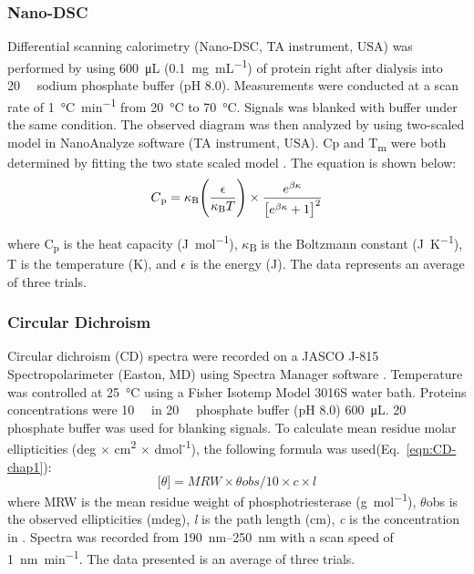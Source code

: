 \begin{refsection}
\subsubsection{Nano-DSC}
\label{sec:dsc-method}

Differential scanning calorimetry (Nano-DSC, TA instrument, USA) was performed
by using \SI{600}{\micro\L} (\SI{0.1}{\mg\per\mL}) of protein right after
dialysis into \SI{20}{\milli\Molar} sodium phosphate buffer (pH 8.0).
Measurements were conducted at a scan rate of \SI{1}{\celsius\per\minute} from
\SI{20}{\celsius} to \SI{70}{\celsius}.  Signals was blanked with buffer under
the same condition.  The observed diagram was then analyzed by using
two-scaled model in NanoAnalyze software (TA instrument, USA). Cp and
T\textsubscript{m} were both determined by fitting the two state scaled model
\cite{Privalov1986}. The equation is shown below:
\begin{equation}
    C\textsubscript{p} = \kappa\textsubscript{B}
    \Bigg(\frac{\epsilon}{\kappa\textsubscript{B}T}\Bigg) \times
    \frac{e^{\beta\kappa}}{\big[e^{\beta\kappa}+1\big]^{2}} \label{eqn:dsc}
\end{equation}

where C\textsubscript{p} is the heat capacity (\si{\J\per\mol}),
$\kappa$\textsubscript{B} is the Boltzmann constant (\si{\J\per\kelvin}), T is
the temperature (\si{\kelvin}), and $\epsilon$ is the energy (\si{J}). The data
represents an average of three trials. 


\subsubsection{Circular Dichroism}
\label{sec:cd-method}

Circular dichroism (CD) spectra were recorded on a JASCO J-815 Spectropolarimeter
(Easton, MD) using Spectra Manager software \cite{Kataev1985}. Temperature was
controlled at \SI{25}{\celsius} using a Fisher Isotemp Model 3016S water bath.
Proteins concentrations were \SI{10}{\micro\Molar} in \SI{20}{\milli\Molar}
phosphate buffer (pH 8.0) \SI{600}{\micro\liter}.  \SI{20}{\milli\Molar}
phosphate buffer was used for blanking signals. To calculate mean residue molar
ellipticities (deg $\times$ cm\textsuperscript{2} $\times$
dmol\textsuperscript{-1}), the following formula \cite{Kelly2005} was
used(Eq.~\ref{eqn:CD-chap1}): 
\begin{equation}
    \big[\theta\big] = MRW \times \theta obs / 10 \times c \times l
    \label{eqn:CD-chap1}
\end{equation}
where MRW is the mean residue weight of phosphotriesterase
(\si{\gram\per\mol}), $\theta$obs is the observed ellipticities (mdeg),
\emph{l} is the path length (cm), \emph{c} is the concentration in
\SI{}{\Molar}. Spectra was recorded from \SIrange{190}{250}{\nm} with a scan
speed of \SI{1}{\nano\meter\per\minute}.  The data presented is an average of
three trials.


\end{refsection}

